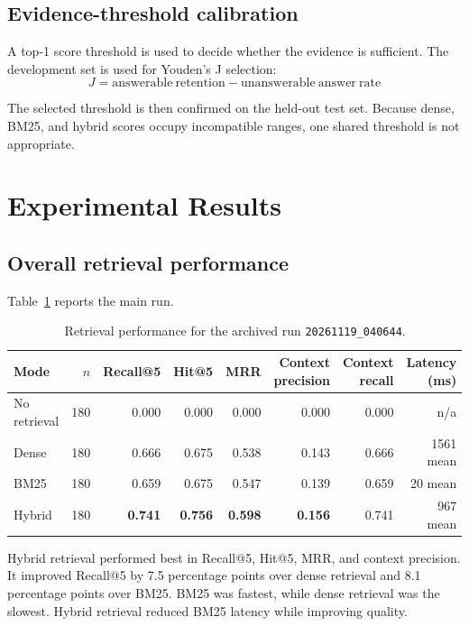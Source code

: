 \documentclass[11pt]{article}
\begin{document}
\subsection{Evidence-threshold calibration}

A top-1 score threshold is used to decide whether the evidence is sufficient. The development set is used for Youden's J selection:
\[
J=\mathrm{answerable\ retention}-\mathrm{unanswerable\ answer\ rate}
\]

The selected threshold is then confirmed on the held-out test set. Because dense, BM25, and hybrid scores occupy incompatible ranges, one shared threshold is not appropriate.

\section{Experimental Results}

\subsection{Overall retrieval performance}

Table~\ref{tab:main-results} reports the main run.

\begin{table}[H]
\centering
\caption{Retrieval performance for the archived run \texttt{20261119\_040644}.}
\label{tab:main-results}
\begin{tabular}{lrrrrrrr}
\toprule
Mode & $n$ & Recall@5 & Hit@5 & MRR & Context precision & Context recall & Latency (ms) \\
\midrule
No retrieval & 180 & 0.000 & 0.000 & 0.000 & 0.000 & 0.000 & n/a \\
Dense & 180 & 0.666 & 0.675 & 0.538 & 0.143 & 0.666 & 1561 mean \\
BM25 & 180 & 0.659 & 0.675 & 0.547 & 0.139 & 0.659 & 20 mean \\
Hybrid & 180 & \textbf{0.741} & \textbf{0.756} & \textbf{0.598} & \textbf{0.156} & 0.741 & 967 mean \\
\bottomrule
\end{tabular}
\end{table}

Hybrid retrieval performed best in Recall@5, Hit@5, MRR, and context precision. It improved Recall@5 by 7.5 percentage points over dense retrieval and 8.1 percentage points over BM25. BM25 was fastest, while dense retrieval was the slowest. Hybrid retrieval reduced BM25 latency while improving quality.
\end{document}
